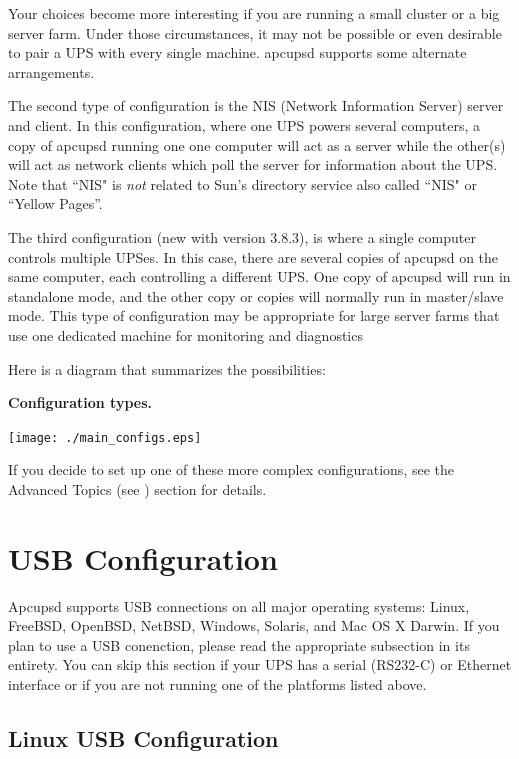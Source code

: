 Your choices become more interesting if you are running a small cluster or a
big server farm.  Under those circumstances, it may not be possible or even
desirable to pair a UPS with every single machine.  apcupsd supports some
alternate arrangements.  

The second type of configuration is the NIS (Network Information Server)
server and client.  In this configuration, where one UPS powers several
computers, a copy of apcupsd running one one computer will act as a
server while the other(s) will act as network clients which poll the
server for information about the UPS.  Note that ``NIS" is \emph{not}
related to Sun's directory service also called ``NIS" or ``Yellow
Pages''.

The third configuration (new with version 3.8.3), is where a single computer
controls multiple UPSes. In this case, there are several copies of apcupsd on
the same computer, each controlling a different UPS. One copy of apcupsd will
run in standalone mode, and the other copy or copies will normally run in
master/slave mode.  This type of configuration may be appropriate for large
server farms that use one dedicated machine for monitoring and diagnostics  

Here is a diagram that summarizes the possibilities: 

\label{Configuration-types_005f}

{\bf Configuration types.}  

\texttt{[image: ./main\_configs.eps]}

If you decide to set up one of these more complex configurations, see the
Advanced Topics (see 
) section for details. 

\section*{USB Configuration}
\label{USB-Configuration}

Apcupsd supports USB connections on all major operating systems: Linux,
FreeBSD, OpenBSD, NetBSD, Windows, Solaris, and Mac OS X Darwin. If
you plan to use a USB conenction, please read the appropriate subsection in
its entirety. You can skip this section if your UPS has a serial (RS232-C)
or Ethernet interface or if you are not running one of the platforms listed
above.

\subsection*{Linux USB Configuration}

